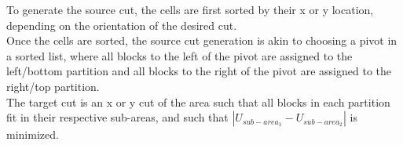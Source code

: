 \documentclass[twocolumn]{article}
\begin{document}
\begin{itemize}
            To generate the source cut, the cells are first sorted by their x or y location, depending on the orientation of the desired cut. \\
            Once the cells are sorted, the source cut generation is akin to choosing a pivot in a sorted list, where all blocks to the left of the pivot are assigned to the left/bottom partition and all blocks to the right of the pivot are assigned to the right/top partition. \\
            The target cut is an x or y cut of the area such that all blocks in each partition fit in their respective sub-areas, and such that \( | U_{sub-area_1} 
             - U_{sub-area_2} | \) is minimized.




    \end{itemize}





\end{document}
